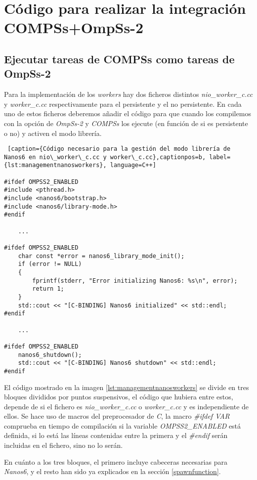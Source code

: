 \section{Código para realizar la integración COMPSs+OmpSs-2}
\label{appendix:integration}

\subsection{Ejecutar tareas de COMPSs como tareas de OmpSs-2}

Para la implementación de los \textit{workers} hay dos ficheros distintos \textit{nio\_worker\_c.cc} y \textit{worker\_c.cc} respectivamente para el persistente y el no persistente. En cada uno de estos ficheros deberemos añadir el código para que cuando los compilemos con la opción de \textit{OmpSs-2} y \textit{COMPSs} los ejecute (en función de si es persistente o no) y activen el modo librería.

\bigskip

\begin{minipage}{\linewidth}
\begin{lstlisting} [caption={Código necesario para la gestión del modo librería de Nanos6 en nio\_worker\_c.cc y worker\_c.cc},captionpos=b, label={lst:managementnanosworkers}, language=C++]

#ifdef OMPSS2_ENABLED
#include <pthread.h>
#include <nanos6/bootstrap.h>
#include <nanos6/library-mode.h>
#endif

    ...

#ifdef OMPSS2_ENABLED
    char const *error = nanos6_library_mode_init();
    if (error != NULL)
    {
        fprintf(stderr, "Error initializing Nanos6: %s\n", error);
        return 1;
    }
    std::cout << "[C-BINDING] Nanos6 initialized" << std::endl;
#endif

    ...
    
#ifdef OMPSS2_ENABLED
    nanos6_shutdown();
    std::cout << "[C-BINDING] Nanos6 shutdown" << std::endl;
#endif

\end{lstlisting}
\end{minipage}

\par\bigskip

El código mostrado en la imagen \ref{lst:managementnanosworkers} se divide en tres bloques divididos por puntos suspensivos, el código que hubiera entre estos, depende de si el fichero es \textit{nio\_worker\_c.cc} o \textit{worker\_c.cc} y es independiente de ellos. Se hace uso de macros del preprocesador de \textit{C}, la macro \textit{\#ifdef VAR} comprueba en tiempo de compilación si la variable \textit{OMPSS2\_ENABLED} está definida, si lo está las líneas contenidas entre la primera y el \textit{\#endif} serán incluidas en el fichero, sino no lo serán.
\par\medskip
En cuánto a los tres bloques, el primero incluye cabeceras necesarias para \textit{Nanos6}, y el resto han sido ya explicados en la sección \ref{spawnfunction}.
\par\bigskip

